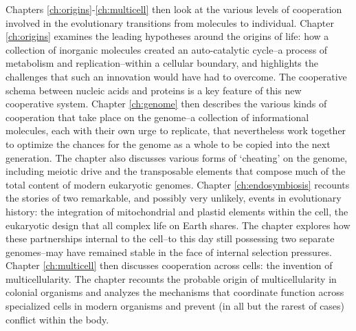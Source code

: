 \documentclass{tufte-book} %
\begin{document}
Chapters \ref{ch:origins}-\ref{ch:multicell} then look at the various levels of cooperation involved in the evolutionary transitions from molecules to individual. Chapter \ref{ch:origins} examines the leading hypotheses around the origins of life: how a collection of inorganic molecules created an auto-catalytic cycle--a process of metabolism and replication--within a cellular boundary, and highlights the challenges that such an innovation would have had to overcome. The cooperative schema between nucleic acids and proteins is a key feature of this new cooperative system. Chapter \ref{ch:genome} then describes the various kinds of cooperation that take place on the genome--a collection of informational molecules, each with their own urge to replicate, that nevertheless work together to optimize the chances for the genome as a whole to be copied into the next generation. The chapter also discusses various forms of `cheating' on the genome, including meiotic drive and the transposable elements that compose much of the total content of modern eukaryotic genomes. Chapter \ref{ch:endosymbiosis} recounts the stories of two remarkable, and possibly very unlikely, events in evolutionary history: the integration of mitochondrial and plastid elements within the cell, the eukaryotic design that all complex life on Earth shares. The chapter explores how these partnerships internal to the cell--to this day still possessing two separate genomes--may have remained stable in the face of internal selection pressures. Chapter \ref{ch:multicell} then discusses cooperation across cells: the invention of multicellularity. The chapter recounts the probable origin of multicellularity in colonial organisms and analyzes the mechanisms that coordinate function across specialized cells in modern organisms and prevent (in all but the rarest of cases) conflict within the body.
\end{document}
